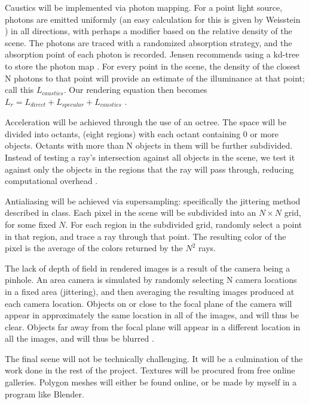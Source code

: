 \documentclass {article}
\begin{document}
\begin{description}
    Caustics will be implemented via photon mapping. For a point light source, photons are emitted uniformly (an easy calculation for this is given by Weisstein \cite{SpherePicking}) in all directions, with perhaps a modifier based on the relative density of the scene. The photons are traced with a randomized absorption strategy, and the absorption point of each photon is recorded. Jensen recommends using a kd-tree to store the photon map \cite{Jensen}. For every point in the scene, the density of the closest N photons to that point will provide an estimate of the illuminance at that point; call this $L_{caustics}$. Our rendering equation then becomes $L_r = L_{direct} + L_{specular} + L_{caustics}$ \cite{Watters}.
    
    Acceleration will be achieved through the use of an octree. The space will be divided into octants, (eight regions) with each octant containing $0$ or more objects. Octants with more than N objects in them will be further subdivided. Instead of testing a ray's intersection against all objects in the scene, we test it against only the objects in the regions that the ray will pass through, reducing computational overhead \cite{WattOct}.

    Antialiasing will be achieved via supersampling: specifically the jittering method described in class. Each pixel in the scene will be subdivided into an $N\times N$ grid, for some fixed $N$. For each region in the subdivided grid, randomly select a point in that region, and trace a ray through that point. The resulting color of the pixel is the average of the colors returned by the $N^2$ rays.
    
    The lack of depth of field in rendered images is a result of the camera being a pinhole. An area camera is simulated by randomly selecting N camera locations in a fixed area (jittering), and then averaging the resulting images produced at each camera location. Objects on or close to the focal plane of the camera will appear in approximately the same location in all of the images, and will thus be clear. Objects far away from the focal plane will appear in a different location in all the images, and will thus be blurred \cite{WattDOF}.
    
    The final scene will not be technically challenging. It will be a culmination of the work done in the rest of the project. Textures will be procured from free online galleries. Polygon meshes will either be found online, or be made by myself in a program like Blender.


\end{description}
\end{document}
